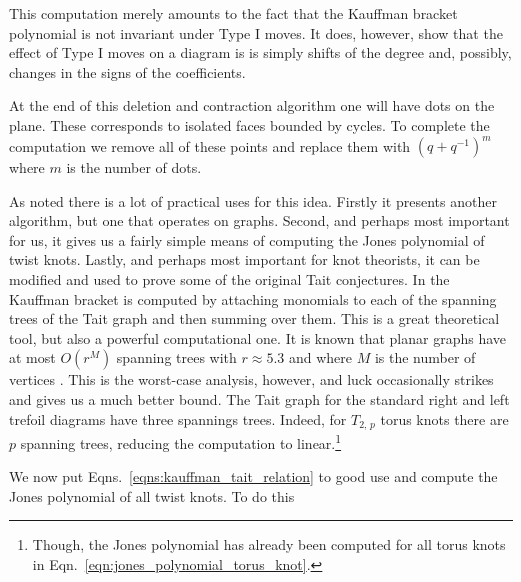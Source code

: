             This computation merely amounts to the fact that the Kauffman
            bracket polynomial is not invariant under Type I moves. It does,
            however, show that the effect of Type I moves on a diagram is
            is simply shifts of the degree and, possibly, changes in the signs
            of the coefficients.
            \par\hfill\par
            At the end of this deletion and contraction algorithm one will have
            dots on the plane. These corresponds to isolated faces bounded
            by cycles. To complete the computation we remove all of these
            points and replace them with $(q+q^{-1})^{m}$ where $m$ is the
            number of dots.
            \par\hfill\par
            As noted there is a lot of practical uses for this idea. Firstly
            it presents another algorithm, but one that operates on graphs.
            Second, and perhaps most important for us, it gives us a fairly
            simple means of computing the Jones polynomial of twist knots.
            Lastly, and perhaps most important for knot theorists, it can be
            modified and used to prove some of the original Tait conjectures.
            In \cite{ThistlethwaiteSpanningTree} the Kauffman bracket is
            computed by attaching monomials to each of the spanning trees of
            the Tait graph and then summing over them. This is a great
            theoretical tool, but also a powerful computational one.
            It is known that planar graphs have at most
            $O(r^{M})$ spanning trees with $r\approx{5.3}$ and where $M$ is the
            number of vertices \cite{NumberOfSpanningTrees}. This is the
            worst-case analysis, however, and luck occasionally strikes and
            gives us a much better bound. The Tait graph for the standard
            right and left trefoil diagrams have three spannings trees. Indeed,
            for $T_{2,\,p}$ torus knots there are $p$ spanning trees, reducing
            the computation to linear.\footnote{%
                Though, the Jones polynomial has already been computed for
                all torus knots in Eqn.~\ref{eqn:jones_polynomial_torus_knot}.
            }
            \par\hfill\par
            We now put Eqns.~\ref{eqns:kauffman_tait_relation} to good use
            and compute the Jones polynomial of all twist knots. To do this
